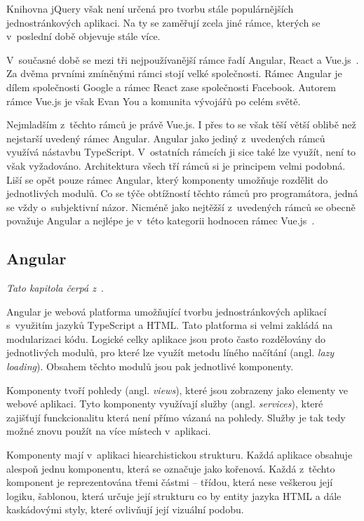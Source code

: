 Knihovna jQuery však není určená pro tvorbu stále populárnějších jednostránkových aplikaci. Na ty se zaměřují zcela jiné rámce, kterých se v~poslední době objevuje stále více.

V~současné době se mezi tři nejpoužívanější rámce řadí Angular, React a Vue.js~\cite{bib:js-framework}. Za dvěma prvními zmíněnými rámci stojí velké společnosti. Rámec Angular je dílem společnosti Google a rámec React zase společnosti Facebook. Autorem rámce Vue.js je však Evan You a komunita vývojářů po celém světě.

Nejmladším z~těchto rámců je právě Vue.js. I přes to se však těší větší oblibě než nejstarší uvedený rámec Angular. Angular jako jediný z~uvedených rámců využívá nástavbu TypeScript. V~ostatních rámcích ji sice také lze využít, není to však vyžadováno. Architektura všech tří rámců si je principem velmi podobná. Liší se opět pouze rámec Angular, který komponenty umožňuje rozdělit do jednotlivých modulů. Co se týče obtížností těchto rámců pro programátora, jedná se vždy o~subjektivní názor. Nicméně jako nejtěžší z~uvedených rámců se obecně považuje Angular a nejlépe je v~této kategorii hodnocen rámec Vue.js~\cite{bib:angular-vs-react-vs-vue}.



\subsection{Angular}
\emph{Tato kapitola čerpá z~\cite{bib:ng-arch}}.

Angular je webová platforma umožňující tvorbu jednostránkových aplikací s~využitím jazyků TypeScript a HTML. Tato platforma si velmi zakládá na modularizaci kódu. Logické celky aplikace jsou proto často rozdělovány do jednotlivých modulů, pro které lze využít metodu líného načítání (angl. \emph{lazy loading}). Obsahem těchto modulů jsou pak jednotlivé komponenty. 

Komponenty tvoří pohledy (angl. \emph{views}), které jsou zobrazeny jako elementy ve webové aplikaci. Tyto komponenty využívají služby (angl. \emph{services}), které zajišťují funckcionalitu která není přímo vázaná na pohledy. Služby je tak tedy možné znovu použít na více místech v~aplikaci.

Komponenty mají v~aplikaci hiearchistickou strukturu. Každá aplikace obsahuje alespoň jednu komponentu, která se označuje jako kořenová. Každá z~těchto komponent je reprezentována třemi částmi -- třídou, která nese veškerou její logiku, šablonou, která určuje její strukturu co by entity jazyka HTML a dále kaskádovými styly, které ovlivňují její vizuální podobu.

